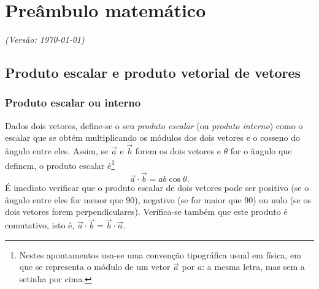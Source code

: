 \chapter{Preâmbulo matemático}
\textsl{{\sffamily(Versão: \today)}}

\section{Produto escalar e produto vetorial de vetores}
\subsection*{Produto escalar ou interno}
Dados dois vetores, define-se o seu \emph{produto escalar} (ou \emph{produto
interno}) como o escalar que se obtém multiplicando os módulos dos dois vetores
e o cosseno do ângulo entre eles. Assim, se $\vec a$ e $\vec b$ forem os dois
vetores e $\theta$ for o ângulo que definem, o produto escalar
é\footnote{Nestes apontamentos usa-se uma convenção tipográfica usual em física,
  em que se representa o módulo de um vetor $\vec a$ por $a$: a mesma letra, mas
sem a setinha por cima.}
\begin{equation}
  \vec a\cdot\vec b= ab\cos\theta.
\end{equation}
É imediato verificar que o produto escalar de dois vetores pode ser positivo (se
o ângulo entre eles for menor que 90\deg), negativo (se for maior que 90\deg) ou
nulo (se os dois vetores forem perpendiculares). Verifica-se também
que este produto é comutativo, isto é, $\vec a\cdot\vec b=\vec b\cdot\vec a$.


